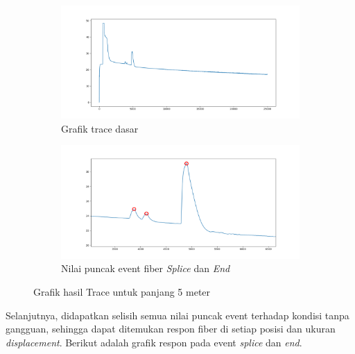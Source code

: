 \documentclass[12pt]{article}
\begin{document}
	\begin{figure}[h!]
		\centering
		\captionsetup{justification=centering}
		\begin{subfigure}[b]{0.7\textwidth}
			\includegraphics[width=\textwidth]{images/Bab_4/Bab_4_5e1}	
			\caption{\small{Grafik trace dasar}}		
		\end{subfigure}
		\begin{subfigure}[b]{0.7\textwidth}
			\includegraphics[width=\linewidth]{images/Bab_4/Bab_4_5e2}
			\caption{\small{Nilai puncak event fiber \textit{Splice} dan \textit{End}}}			
		\end{subfigure}
		\caption[Uji Pagar]{\small{Grafik hasil Trace untuk panjang 5 meter}}
	\end{figure}

\newpage

	Selanjutnya, didapatkan selisih semua nilai puncak event terhadap kondisi tanpa gangguan,
	sehingga dapat ditemukan respon fiber di setiap posisi dan ukuran \textit{displacement}.
	Berikut adalah grafik respon pada event \textit{splice} dan \textit{end}.
	
\end{document}
